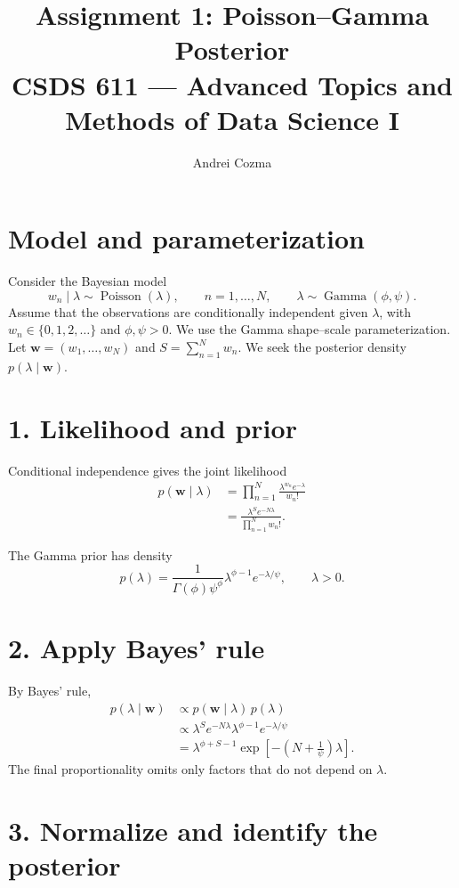 \documentclass[11pt,letterpaper]{article}
\title{%
  Assignment 1: Poisson--Gamma Posterior\\[0.4em]
  {\large CSDS 611 --- Advanced Topics and Methods of Data Science I}%
}
\author{Andrei Cozma}
\date{}
\begin{document}
\maketitle

\section*{Model and parameterization}

Consider the Bayesian model
\[
  w_n\mid\lambda\sim\operatorname{Poisson}(\lambda),
  \qquad n=1,\ldots,N,
  \qquad
  \lambda\sim\operatorname{Gamma}(\phi,\psi).
\]
Assume that the observations are conditionally independent given $\lambda$,
with $w_n\in\{0,1,2,\ldots\}$ and $\phi,\psi>0$.
We use the Gamma shape--scale parameterization.
Let $\mathbf{w}=(w_1,\ldots,w_N)$ and $S=\sum_{n=1}^{N}w_n$.
We seek the posterior density $p(\lambda\mid\mathbf{w})$.

\section*{1. Likelihood and prior}

Conditional independence gives the joint likelihood
\begin{align*}
  p(\mathbf{w}\mid\lambda)
   & =\prod_{n=1}^{N}
  \frac{\lambda^{w_n}e^{-\lambda}}{w_n!} \\
   & =\frac{\lambda^{S}e^{-N\lambda}}
  {\prod_{n=1}^{N}w_n!}.
\end{align*}

The Gamma prior has density
\[
  p(\lambda)
  =\frac{1}{\Gamma(\phi)\psi^{\phi}}
  \lambda^{\phi-1}e^{-\lambda/\psi},
  \qquad \lambda>0.
\]

\section*{2. Apply Bayes' rule}

By Bayes' rule,
\begin{align*}
  p(\lambda\mid\mathbf{w})
   & \propto p(\mathbf{w}\mid\lambda)\,p(\lambda) \\
   & \propto\lambda^{S}e^{-N\lambda}
  \lambda^{\phi-1}e^{-\lambda/\psi}               \\
   & =\lambda^{\phi+S-1}
  \exp\!\left[-\left(N+\frac{1}{\psi}\right)\lambda\right].
\end{align*}
The final proportionality omits only factors that do not depend on $\lambda$.

\section*{3.
  Normalize and identify the posterior}
\end{document}
